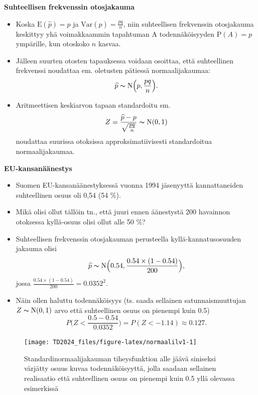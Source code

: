 \documentclass[
]{book}
\begin{document}
\textbf{Suhteellisen frekvenssin otosjakauma}

\begin{itemize}
\item
  Koska \(\text{E}(\widehat{p}) = p\) ja \(\mathrm{Var}(\widehat{p}) = \frac{pq}{n}\),
  niin suhteellisen frekvenssin otosjakauma keskittyy yhä voimakkaammin tapahtuman A
  todennäköisyyden \(\text{P}(A) = p\) ympärille, kun otoskoko \(n\) kasvaa.
\item
  Jälleen suurten otosten tapauksessa voidaan osoittaa, että suhteellinen frekvenssi noudattaa em. oletusten pätiessä normaalijakaumaa:
  \[
  \widehat{p} \thicksim \text{N} \Big(p, \frac{pq}{n} \Big).
  \]
\item
  Aritmeettisen keskiarvon tapaan standardoitu sm.
  \[
  Z = \frac{\widehat{p} - p}{\sqrt{\frac{pq}{n}}} \thicksim \text{N}(0,1)
  \]
  noudattaa suurissa otoksissa approksimatiivisesti standardoitua normaalijakaumaa.
\end{itemize}

\newpage

\begin{eblock}{}

\textbf{EU-kansanäänestys}

\begin{itemize}
\item
  Suomen EU-kansanäänestyksessä vuonna 1994 jäsenyyttä kannattaneiden suhteellinen osuus oli 0,54 (54 \%).
\item
  Mikä olisi ollut tällöin tn., että juuri ennen äänestystä 200 havainnon otoksessa kyllä-osuus olisi ollut alle 50 \%?
\item
  Suhteellisen frekvenssin otosjakauman perusteella kyllä-kannatusosuuden jakauma olisi
  \[
  \widehat{p} \thicksim \text{N} \Big(0.54, \frac{0.54 \times (1-0.54)}{200} \Big),
  \]
  jossa \(\frac{0.54 \times (1-0.54)}{200} = 0.0352^2\).
\item
  Näin ollen haluttu todennäköisyys (ts. saada sellainen satunnaismuuttujan \(Z \thicksim \text{N}(0,1)\) arvo että suhteellinen osuus on pienempi kuin 0.5)
  \[
  P \Big(Z < \frac{0.5-0.54}{0.0352} \Big) = P (Z < -1.14) \approx 0.127.
  \]
\end{itemize}

\end{eblock}

\FloatBarrier
\begin{figure}

{\centering \texttt{[image: TD2024\_files/figure-latex/normaalilv1-1]} 

}

\caption{Standardinormaalijakauman tiheysfunktion alle jäävä siniseksi värjätty osuus kuvaa todennäköisyyttä, jolla saadaan sellainen realisaatio että suhteellinen osuus on pienempi kuin 0.5 yllä olevassa esimerkissä}\label{fig:normaalilv1}
\end{figure}
\FloatBarrier
\end{document}

